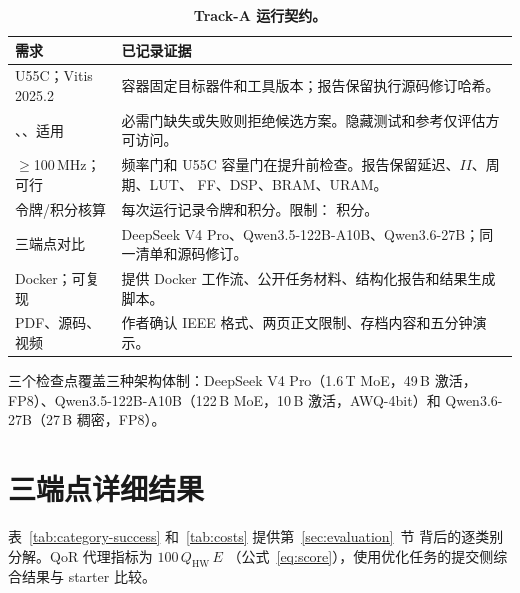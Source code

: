 \begin{table}[H]
  \caption{\textbf{Track-A 运行契约。}}
  \label{tab:compliance}
  \centering
  \small
  \begin{tabular}{p{}p{}}
    \toprule
    需求 & 已记录证据 \\
    \midrule
    U55C；Vitis 2025.2 &
    容器固定目标器件和工具版本；报告保留执行源码修订哈希。 \\
    \CSim{}、\Synth{}、适用 \CoSim{} &
    必需门缺失或失败则拒绝候选方案。隐藏测试和参考仅评估方可访问。 \\
    $\geq$100\,MHz；可行 &
    频率门和 U55C 容量门在提升前检查。报告保留延迟、$II$、周期、LUT、
    FF、DSP、BRAM、URAM。 \\
    令牌/积分核算 &
    每次运行记录令牌和积分。限制：\CampaignCreditLimit{} 积分。 \\
    三端点对比 &
    DeepSeek V4 Pro、Qwen3.5-122B-A10B、Qwen3.6-27B；同一清单和源码修订。 \\
    Docker；可复现 &
    提供 Docker 工作流、公开任务材料、结构化报告和结果生成脚本。 \\
    PDF、源码、视频 &
    作者确认 IEEE 格式、两页正文限制、存档内容和五分钟演示。 \\
    \bottomrule
  \end{tabular}
\end{table}

三个检查点覆盖三种架构体制：DeepSeek V4 Pro（1.6\,T MoE，49\,B 激活，
FP8）、Qwen3.5-122B-A10B（122\,B MoE，10\,B 激活，AWQ-4bit）和
Qwen3.6-27B（27\,B 稠密，FP8）。

\section{三端点详细结果}
\label{app:results}

表~\ref{tab:category-success} 和~\ref{tab:costs} 提供第~\ref{sec:evaluation}~节
背后的逐类别分解。QoR 代理指标为 $100\,Q_{\mathrm{HW}}\,E$
（公式~\eqref{eq:score}），使用优化任务的提交侧综合结果与 starter 比较。

